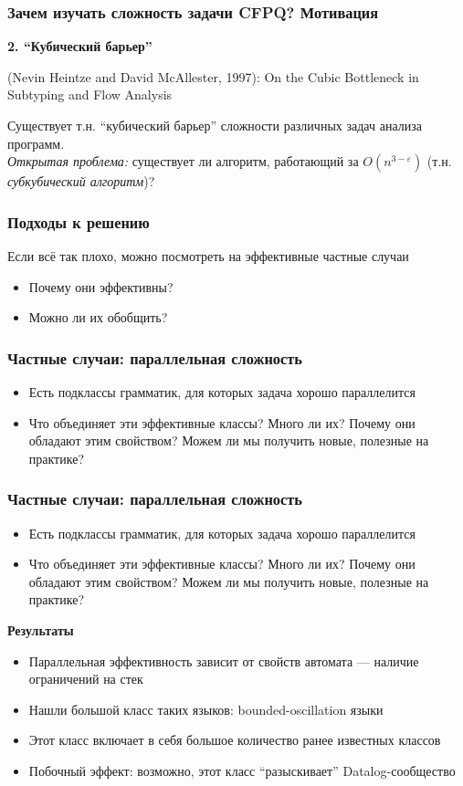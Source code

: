 \documentclass{beamer}
\begin{document}
\begin{frame}
\frametitle{Зачем изучать сложность задачи CFPQ? Мотивация}
\textbf{2. ``Кубический барьер''}


 (Nevin Heintze and David McAllester, 1997): On the Cubic Bottleneck in Subtyping and Flow Analysis

Существует т.н. ``кубический барьер'' сложности различных задач анализа программ.
\\\textit{Открытая проблема:} существует ли алгоритм, работающий за $O(n^{3-\varepsilon})$ (т.н. \textit{субкубический алгоритм})?
\end{frame}

\begin{frame}
\frametitle{Подходы к решению}

Если всё так плохо, можно посмотреть на эффективные частные случаи
\begin{itemize}
\item Почему они эффективны?
\item Можно ли их обобщить?
\end{itemize}
\end{frame}


\begin{frame}
\frametitle{Частные случаи: параллельная сложность}
\begin{itemize}
\item Есть подклассы грамматик, для которых задача хорошо параллелится
\item Что объединяет эти эффективные классы? Много ли их? Почему они обладают этим свойством? Можем ли мы получить новые, полезные на практике?
\end{itemize}
\end{frame}

\begin{frame}
\frametitle{Частные случаи: параллельная сложность}
\begin{itemize}
\item Есть подклассы грамматик, для которых задача хорошо параллелится
\item Что объединяет эти эффективные классы? Много ли их? Почему они обладают этим свойством? Можем ли мы получить новые, полезные на практике?
\end{itemize}

\textbf{Результаты}
\begin{itemize}
\item Параллельная эффективность зависит от свойств автомата --- наличие ограничений на стек
\item Нашли большой класс таких языков: bounded-oscillation языки
\item Этот класс включает в себя большое количество ранее известных классов
\item Побочный эффект: возможно, этот класс ``разыскивает'' Datalog-сообщество
\end{itemize}
\end{frame}
\end{document}
